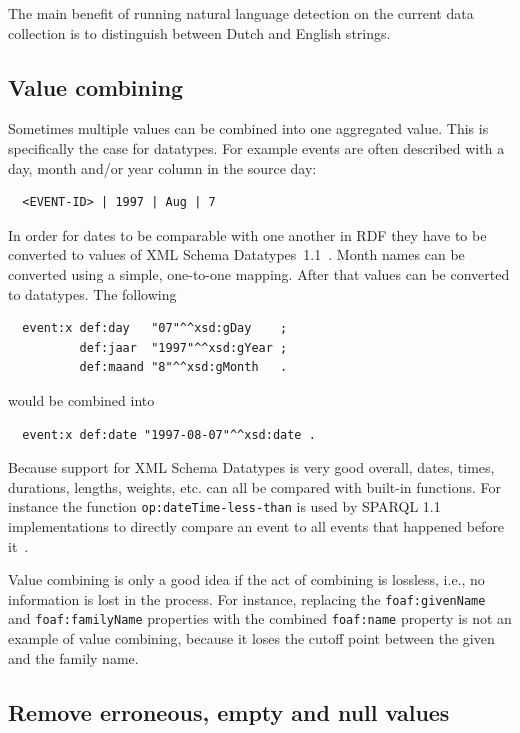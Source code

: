 \documentclass[a4paper]{scrartcl}
\newcommand{\textt}[1]{{\small \texttt{#1}}}
\begin{document}
The main benefit of running natural language detection on the current
data collection is to distinguish between Dutch and English strings.


\subsection{Value combining}
\label{sec:value_combining}

Sometimes multiple values can be combined into one aggregated value.
This is specifically the case for datatypes.  For example events are
often described with a day, month and/or year column in the source
day:

\begin{verbatim}
  <EVENT-ID> | 1997 | Aug | 7
\end{verbatim}

In order for dates to be comparable with one another in RDF they have
to be converted to values of XML Schema
Datatypes~1.1~\cite{Peterson2012}.  Month names can be converted using
a simple, one-to-one mapping.  After that values can be converted
to datatypes.  The following

\begin{verbatim}
  event:x def:day   "07"^^xsd:gDay    ;
          def:jaar  "1997"^^xsd:gYear ;
          def:maand "8"^^xsd:gMonth   .
\end{verbatim}

would be combined into

\begin{verbatim}
  event:x def:date "1997-08-07"^^xsd:date .
\end{verbatim}

Because support for XML Schema Datatypes is very good overall, dates,
times, durations, lengths, weights, etc. can all be compared with
built-in functions.  For instance the function
\textt{op:dateTime-less-than} is used by SPARQL 1.1 implementations to
directly compare an event to all events that happened before
it~\cite{Malhotra2015}.

Value combining is only a good idea if the act of combining is
lossless, i.e., no information is lost in the process.  For instance,
replacing the \textt{foaf:givenName} and \textt{foaf:familyName}
properties with the combined \textt{foaf:name} property is not an
example of value combining, because it loses the cutoff point between
the given and the family name.


\subsection{Remove erroneous, empty and null values}
\label{sec:null}
\end{document}
